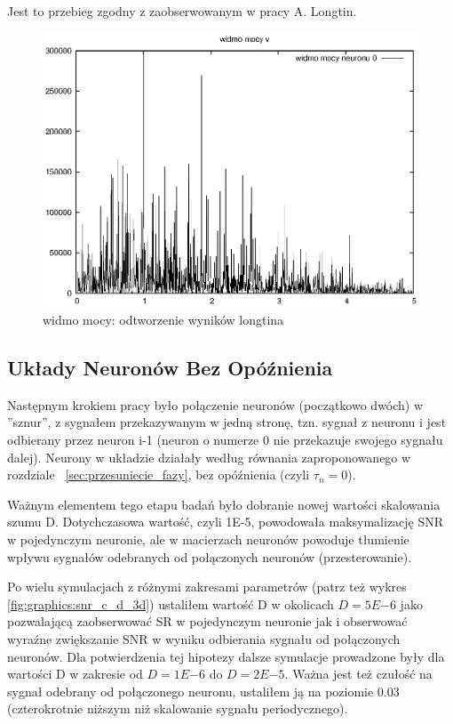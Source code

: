   Jest to przebieg zgodny z zaobserwowanym w pracy A. Longtin.

  \begin{figure}
    \includegraphics[width=140mm]{images/1neuron/3}
    \caption{widmo mocy: odtworzenie wyników longtina}
    \label{graphics:sym1fft}
  \end{figure}

  
  \subsection{Układy Neuronów Bez Opóźnienia}
  
  Następnym krokiem pracy było połączenie neuronów (początkowo dwóch) w ''sznur'', z sygnałem przekazywanym w jedną stronę, tzn. sygnał z neuronu i jest odbierany przez neuron i-1 (neuron o numerze 0 nie przekazuje swojego sygnału dalej). Neurony w układzie działały według równania zaproponowanego w rozdziale ~\ref{sec:przesuniecie_fazy}, bez opóźnienia (czyli $\tau_{n} = 0$).

  Ważnym elementem tego etapu badań było dobranie nowej wartości skalowania szumu D. Dotychczasowa wartość, czyli 1E-5, powodowała maksymalizację SNR w pojedynczym neuronie, ale w macierzach neuronów powoduje tłumienie wpływu sygnałów odebranych od połączonych neuronów (przesterowanie).

  Po wielu symulacjach z różnymi zakresami parametrów (patrz też wykres \ref{fig:graphics:snr_c_d_3d}) ustaliłem wartość D w okolicach $D=5E{-6}$ jako pozwalającą zaobserwować SR w pojedynczym neuronie jak i obserwować wyraźne zwiększanie SNR w wyniku odbierania sygnału od połączonych neuronów. Dla potwierdzenia tej hipotezy dalsze symulacje prowadzone były dla wartości D w zakresie od $D=1E{-6}$ do $D=2E{-5}$. Ważna jest też czułość na sygnał odebrany od połączonego neuronu, ustaliłem ją na poziomie 0.03 (czterokrotnie niższym niż skalowanie sygnału periodycznego).

